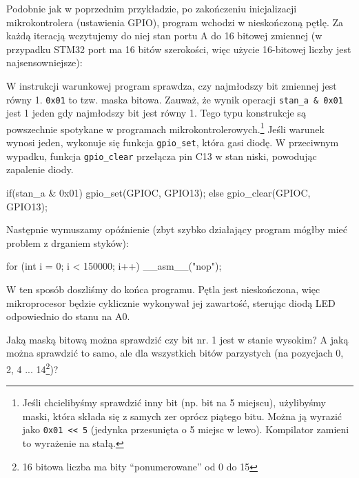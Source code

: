 \documentclass{pdfBooklets}
\begin{document}
Podobnie jak w poprzednim przykładzie, po zakończeniu inicjalizacji mikrokontrolera (ustawienia GPIO), program
wchodzi w nieskończoną pętlę. Za każdą iteracją wczytujemy do niej stan portu A do 16 bitowej zmiennej
(w przypadku STM32 port ma 16 bitów szerokości, więc użycie 16-bitowej liczby jest najsensowniejsze):

\begin{CodeFrame*}[c]{}
  int16_t stan_a;

  while(1){
    stan_a = gpio_port_read(GPIOA);
\end{CodeFrame*}

W instrukcji warunkowej program sprawdza, czy najmłodszy bit zmiennej jest równy 1. \texttt{0x01} to tzw. maska bitowa.
Zauważ, że wynik operacji \texttt{\Verb$stan_a & 0x01$} jest 1 jeden gdy najmłodszy bit jest równy 1. Tego typu
konstrukcje są powszechnie spotykane w programach mikrokontrolerowych.\footnote{
	Jeśli chcielibyśmy sprawdzić inny bit (np. bit na 5 miejscu), użylibyśmy maski, która składa się z samych zer oprócz piątego bitu.
	Można ją wyrazić jako \Verb$0x01 << 5$ (jedynka przesunięta o 5 miejsc w lewo). Kompilator zamieni to wyrażenie na stałą.
}
Jeśli warunek wynosi jeden, wykonuje się funkcja \Verb$gpio_set$, która gasi diodę. W przeciwnym wypadku, funkcja
\Verb$gpio_clear$ przełącza pin C13 w stan niski, powodując zapalenie diody.

\begin{CodeFrame*}[c]{}
    if(stan_a & 0x01){
      gpio_set(GPIOC, GPIO13);
    }else{
      gpio_clear(GPIOC, GPIO13);
    }
\end{CodeFrame*}

Następnie wymuszamy opóźnienie (zbyt szybko działający program mógłby mieć problem z drganiem styków):

\begin{CodeFrame*}[c]{}
    for (int i = 0; i < 150000; i++) __asm__("nop");
\end{CodeFrame*}

W ten sposób doszliśmy do końca programu. Pętla jest nieskończona, więc mikroprocesor będzie cyklicznie wykonywał
jej zawartość, sterując diodą LED odpowiednio do stanu na A0.


\begin{Zadanie}{}{}
  Jaką maską bitową można sprawdzić czy bit nr. 1 jest w stanie wysokim? A jaką można sprawdzić to samo, ale
  dla wszystkich bitów parzystych (na pozycjach 0, 2, 4 ... 14\footnote{16 bitowa liczba ma bity ``ponumerowane'' od 0 do 15})?
\end{Zadanie}
\end{document}
